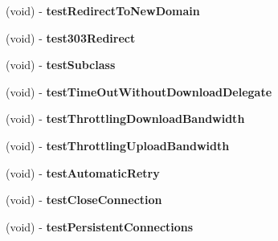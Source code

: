 \begin{DoxyCompactItemize}
\item 
\hypertarget{interface_a_s_i_h_t_t_p_request_tests_a0e46e6d0e9b2075145255c89cb0f23ae}{
(void) -\/ {\bfseries test\-Redirect\-To\-New\-Domain}}
\label{interface_a_s_i_h_t_t_p_request_tests_a0e46e6d0e9b2075145255c89cb0f23ae}

\item 
\hypertarget{interface_a_s_i_h_t_t_p_request_tests_a486f80b7859c2c3ea72e06a28fdcf789}{
(void) -\/ {\bfseries test303\-Redirect}}
\label{interface_a_s_i_h_t_t_p_request_tests_a486f80b7859c2c3ea72e06a28fdcf789}

\item 
\hypertarget{interface_a_s_i_h_t_t_p_request_tests_aeb6e4b4f2fc9f3a74b3cd2a6c42341d5}{
(void) -\/ {\bfseries test\-Subclass}}
\label{interface_a_s_i_h_t_t_p_request_tests_aeb6e4b4f2fc9f3a74b3cd2a6c42341d5}

\item 
\hypertarget{interface_a_s_i_h_t_t_p_request_tests_ae19beb94bca46a1dcb81e4729dc89f2f}{
(void) -\/ {\bfseries test\-Time\-Out\-Without\-Download\-Delegate}}
\label{interface_a_s_i_h_t_t_p_request_tests_ae19beb94bca46a1dcb81e4729dc89f2f}

\item 
\hypertarget{interface_a_s_i_h_t_t_p_request_tests_af14e80be1ca16f71c636a799356bb92d}{
(void) -\/ {\bfseries test\-Throttling\-Download\-Bandwidth}}
\label{interface_a_s_i_h_t_t_p_request_tests_af14e80be1ca16f71c636a799356bb92d}

\item 
\hypertarget{interface_a_s_i_h_t_t_p_request_tests_a65f252fc1eea28887974dd1ff8354609}{
(void) -\/ {\bfseries test\-Throttling\-Upload\-Bandwidth}}
\label{interface_a_s_i_h_t_t_p_request_tests_a65f252fc1eea28887974dd1ff8354609}

\item 
\hypertarget{interface_a_s_i_h_t_t_p_request_tests_aed737183009eb013ed056fb74423c9ab}{
(void) -\/ {\bfseries test\-Automatic\-Retry}}
\label{interface_a_s_i_h_t_t_p_request_tests_aed737183009eb013ed056fb74423c9ab}

\item 
\hypertarget{interface_a_s_i_h_t_t_p_request_tests_a266591fd53dafdd64e6b175e59f1439c}{
(void) -\/ {\bfseries test\-Close\-Connection}}
\label{interface_a_s_i_h_t_t_p_request_tests_a266591fd53dafdd64e6b175e59f1439c}

\item 
\hypertarget{interface_a_s_i_h_t_t_p_request_tests_a23d2a0e836cb5aa242ee26182047fc6b}{
(void) -\/ {\bfseries test\-Persistent\-Connections}}
\label{interface_a_s_i_h_t_t_p_request_tests_a23d2a0e836cb5aa242ee26182047fc6b}


\end{DoxyCompactItemize}
